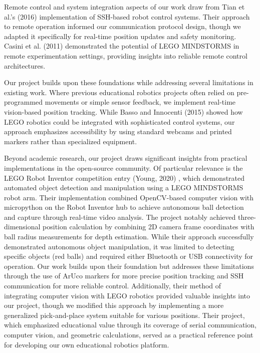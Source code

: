 \documentclass[10pt,twocolumn]{article}
\begin{document}
Remote control and system integration aspects of our work draw from Tian et al.'s (2016) \cite{tian2016development} implementation of SSH-based robot control systems. Their approach to remote operation informed our communication protocol design, though we adapted it specifically for real-time position updates and safety monitoring. Casini et al. (2011) \cite{casini2011lego} demonstrated the potential of LEGO MINDSTORMS in remote experimentation settings, providing insights into reliable remote control architectures.

Our project builds upon these foundations while addressing several limitations in existing work. Where previous educational robotics projects often relied on pre-programmed movements or simple sensor feedback, we implement real-time vision-based position tracking. While Basso and Innocenti (2015) \cite{basso2015lego} showed how LEGO robotics could be integrated with sophisticated control systems, our approach emphasizes accessibility by using standard webcams and printed markers rather than specialized equipment.

Beyond academic research, our project draws significant insights from practical implementations in the open-source community. Of particular relevance is the LEGO Robot Inventor competition entry (Young, 2020) \cite{EddieYoung2020legoarm}, which demonstrated automated object detection and manipulation using a LEGO MINDSTORMS robot arm. Their implementation combined OpenCV-based computer vision with micropython on the Robot Inventor hub to achieve autonomous ball detection and capture through real-time video analysis. The project notably achieved three-dimensional position calculation by combining 2D camera frame coordinates with ball radius measurements for depth estimation. While their approach successfully demonstrated autonomous object manipulation, it was limited to detecting specific objects (red balls) and required either Bluetooth or USB connectivity for operation. Our work builds upon their foundation but addresses these limitations through the use of ArUco markers for more precise position tracking and SSH communication for more reliable control. Additionally, their method of integrating computer vision with LEGO robotics provided valuable insights into our project, though we modified this approach by implementing a more generalized pick-and-place system suitable for various positions. Their project, which emphasized educational value through its coverage of serial communication, computer vision, and geometric calculations, served as a practical reference point for developing our own educational robotics platform.
\end{document}
